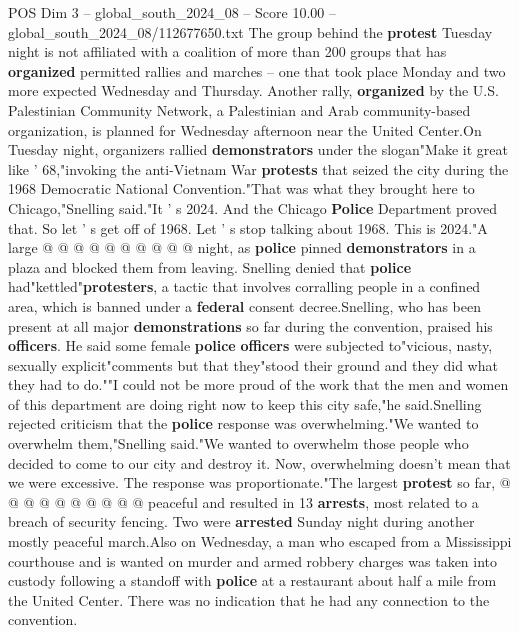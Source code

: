 \begin{textsample}{POS Dim 3 – global\_south\_2024\_08 – Score 10.00 – global\_south\_2024\_08/112677650.txt}
The group behind the \textbf{protest} Tuesday night is not affiliated with a coalition of more than 200 groups that has \textbf{organized} permitted rallies and marches -- one that took place Monday and two more expected Wednesday and Thursday.
Another rally, \textbf{organized} by the U.S.
Palestinian Community Network, a Palestinian and Arab community-based organization, is planned for Wednesday afternoon near the United Center.On Tuesday night, organizers rallied \textbf{demonstrators} under the slogan"Make it great like ' 68,"invoking the anti-Vietnam War \textbf{protests} that seized the city during the 1968 Democratic National Convention."That was what they brought here to Chicago,"Snelling said."It ' s 2024.
And the Chicago \textbf{Police} Department proved that.
So let ' s get off of 1968.
Let ' s stop talking about 1968.
This is 2024."A large @ @ @ @ @ @ @ @ @ @ night, as \textbf{police} pinned \textbf{demonstrators} in a plaza and blocked them from leaving.
Snelling denied that \textbf{police} had"kettled"\textbf{protesters}, a tactic that involves corralling people in a confined area, which is banned under a \textbf{federal} consent decree.Snelling, who has been present at all major \textbf{demonstrations} so far during the convention, praised his \textbf{officers}.
He said some female \textbf{police} \textbf{officers} were subjected to"vicious, nasty, sexually explicit"comments but that they"stood their ground and they did what they had to do.""I could not be more proud of the work that the men and women of this department are doing right now to keep this city safe,"he said.Snelling rejected criticism that the \textbf{police} response was overwhelming."We wanted to overwhelm them,"Snelling said."We wanted to overwhelm those people who decided to come to our city and destroy it.
Now, overwhelming doesn't mean that we were excessive.
The response was proportionate."The largest \textbf{protest} so far, @ @ @ @ @ @ @ @ @ @ peaceful and resulted in 13 \textbf{arrests}, most related to a breach of security fencing.
Two were \textbf{arrested} Sunday night during another mostly peaceful march.Also on Wednesday, a man who escaped from a Mississippi courthouse and is wanted on murder and armed robbery charges was taken into custody following a standoff with \textbf{police} at a restaurant about half a mile from the United Center.
There was no indication that he had any connection to the convention.

\end{textsample}
